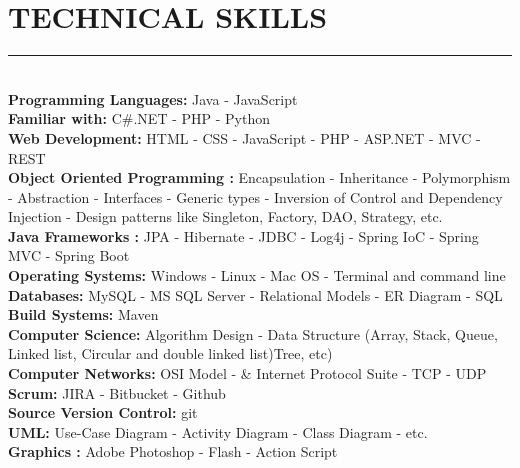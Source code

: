 \documentclass[10pt,a4paper]{article}
\begin{document}
\section{TECHNICAL SKILLS}
\noindent \rule {18.0cm}{0.2pt} \\
\noindent
\textbullet \hspace{0.1cm}\textbf{Programming Languages:} Java - JavaScript \\
\textbullet \hspace{0.1cm}\textbf{Familiar with:} C\#.NET - PHP - Python \\
\textbullet \hspace{0.1cm}\textbf{Web Development:} HTML - CSS - JavaScript - PHP - ASP.NET - MVC - REST \\
\textbullet \hspace{0.1cm}\textbf{Object Oriented Programming :} Encapsulation - Inheritance - Polymorphism - Abstraction - Interfaces - Generic types - Inversion of Control and Dependency Injection - Design patterns like Singleton, Factory, DAO, Strategy, etc.\\
\textbullet \hspace{0.1cm}\textbf{Java Frameworks :} JPA - Hibernate - JDBC - Log4j - Spring IoC - Spring MVC - Spring Boot \\
\textbullet \hspace{0.1cm}\textbf{Operating Systems:} Windows - Linux - Mac OS - Terminal and command line \\
\textbullet \hspace{0.1cm}\textbf{Databases:} MySQL - MS SQL Server - Relational Models - ER Diagram - SQL \\
\textbullet \hspace{0.1cm}\textbf{Build Systems:} Maven \\
\textbullet \hspace{0.1cm}\textbf{Computer Science:} Algorithm Design - Data Structure (Array, Stack, Queue, Linked list, Circular and double linked list)Tree, etc) \\
\textbullet \hspace{0.1cm}\textbf{Computer Networks:} OSI Model - \& Internet Protocol Suite - TCP - UDP \\
\textbullet \hspace{0.1cm}\textbf{Scrum:} JIRA - Bitbucket - Github \\
\textbullet \hspace{0.1cm}\textbf{Source Version Control:} git \\
\textbullet \hspace{0.1cm}\textbf{UML:} Use-Case Diagram - Activity Diagram - Class Diagram - etc. \\
\textbullet \hspace{0.1cm}\textbf{Graphics :} Adobe Photoshop - Flash - Action Script
\end{document}
